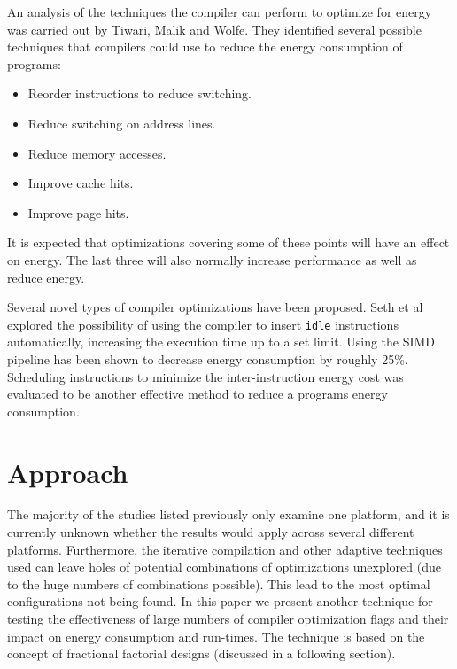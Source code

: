 \documentclass[twocolumn]{article}
\begin{document}
An analysis of the techniques the compiler can perform to optimize for energy was carried out by Tiwari, Malik and Wolfe\cite{CompilationTechniquesForLowEnergy}. They identified several possible techniques that compilers could use to reduce the energy consumption of programs:
\begin{itemize}
	\setlength{\itemsep}{-0.4em}
	\vspace{-2mm}

	\item Reorder instructions to reduce switching.
	\item Reduce switching on address lines.
	\item Reduce memory accesses.
	\item Improve cache hits.
	\item Improve page hits.
\end{itemize}

It is expected that optimizations covering some of these points will have an effect on energy. The last three will also normally increase performance as well as reduce energy.

Several novel types of compiler optimizations have been proposed. Seth et al\cite{Seth2001} explored the possibility of using the compiler to insert \texttt{idle} instructions automatically, increasing the execution time up to a set limit. Using the SIMD pipeline has been shown to decrease energy consumption\cite{Ibrahim2009} by roughly 25\%. Scheduling instructions to minimize the inter-instruction energy cost was evaluated to be another effective method to reduce a programs energy consumption\cite{Parikh}.

\section{Approach}

The majority of the studies listed previously only examine one platform, and it is currently unknown whether the results would apply across several different platforms. Furthermore, the iterative compilation and other adaptive techniques used can leave holes of potential combinations of optimizations unexplored (due to the huge numbers of combinations possible). This lead to the most optimal configurations not being found. In this paper we present another technique for testing the effectiveness of large numbers of compiler optimization flags and their impact on energy consumption and run-times. The technique is based on the concept of fractional factorial designs (discussed in a following section).
\end{document}
